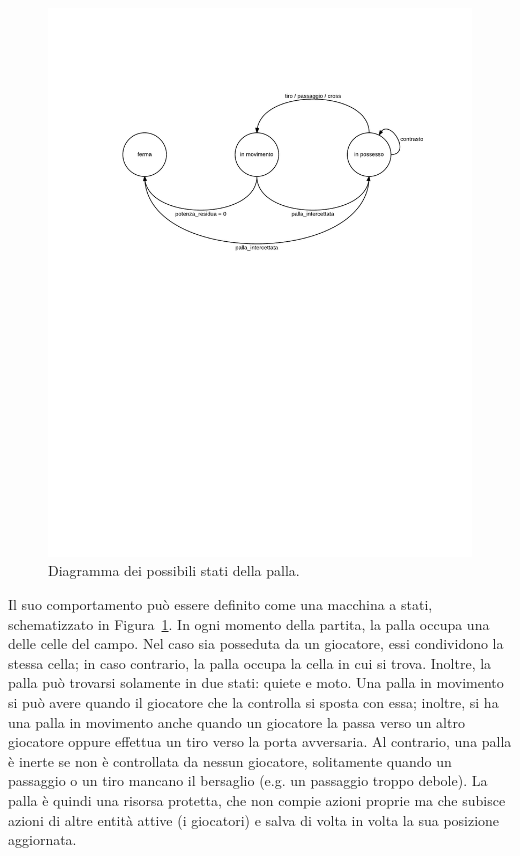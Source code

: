 \begin{figure}[htb!]
	\centering
	\includegraphics[scale=.8]{images/ball_state_diagram}
	\caption{Diagramma dei possibili stati della palla.}
	\label{fig:ball_state_diagram}
\end{figure}

Il suo comportamento può essere definito come una macchina a stati, schematizzato in Figura~\ref{fig:ball_state_diagram}. In ogni momento della partita, la palla occupa una delle celle del campo. Nel caso sia posseduta da un giocatore, essi condividono la stessa cella; in caso contrario, la palla occupa la cella in cui si trova. Inoltre, la palla può trovarsi solamente in due stati: quiete e moto. Una palla in movimento si può avere quando il giocatore che la controlla si sposta con essa; inoltre, si ha una palla in movimento anche quando un giocatore la passa verso un altro giocatore oppure effettua un tiro verso la porta avversaria. Al contrario, una palla è inerte se non è controllata da nessun giocatore, solitamente quando un passaggio o un tiro mancano il bersaglio (e.g. un passaggio troppo debole). La palla è quindi una risorsa protetta, che non compie azioni proprie ma che subisce azioni di altre entità attive (i giocatori) e salva di volta in volta la sua posizione aggiornata.\\

